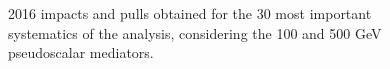 \documentclass[a4paper, 10pt, openright]{report}
\begin{document}
\begin{appendices}
\begin{figure}[htbp]
\centering
{}
\caption{2016 impacts and pulls obtained for the 30 most important systematics of the analysis, considering the 100 and 500 GeV pseudoscalar mediators.}
\label{fig:impactsPseudo}
\end{figure}

\end{appendices}
\end{document}
